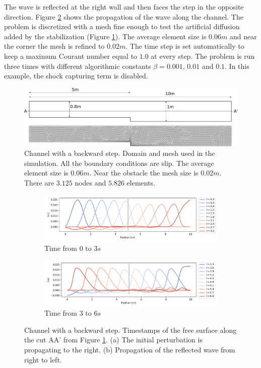 \documentclass[a4paper,12pt]{elsarticle}
\begin{document}
The wave is reflected at the right wall and then faces the step in the opposite direction.
Figure \ref{waves_propagation} shows the propagation of the wave along the channel.
The problem is discretized with a mesh fine enough to test the artificial diffusion added by the stabilization (Figure \ref{step_mesh}). The average element size is $0.06m$ and near the corner the mesh is refined to $0.02m$.
The time step is set automatically to keep a maximum Courant number equal to $1.0$ at every step. The problem is run three times with different algorithmic constants $\beta = 0.001$, $0.01$ and $0.1$. In this example, the shock capturing term is disabled.

\begin{figure}
    \includegraphics[width=\textwidth]{img/step/geometry.pdf}
    \caption{Channel with a backward step. Domain and mesh used in the simulation. All the boundary conditions are slip. The average element size is $0.06m$. Near the obstacle the mesh size is $0.02m$. There are $3.125$ nodes and $5.826$ elements.}
    \label{step_mesh}
\end{figure}

\begin{figure}[H]
\begin{subfigure}{\textwidth}
    \centering
    \includegraphics[width=\textwidth]{img/step/free_surface_1.pdf}
    \caption{Time from $0$ to $3s$}
\end{subfigure}
\begin{subfigure}{\textwidth}
    \centering
    \includegraphics[width=\textwidth]{img/step/free_surface_2.pdf}
    \caption{Time from $3$ to $6s$}
\end{subfigure}
\caption{Channel with a backward step. Timestamps of the free surface along the cut AA' from Figure \ref{step_mesh}. (a) The initial perturbation is propagating to the right. (b) Propagation of the reflected wave from right to left.}
\label{waves_propagation}
\end{figure}
\end{document}
